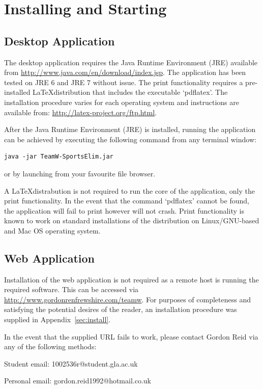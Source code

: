 \section{Installing and Starting}

\subsection{Desktop Application}

The desktop application requires the Java Runtime Environment (JRE) available
from \url{http://www.java.com/en/download/index.jsp}. The application has been
tested on JRE 6 and JRE 7 without issue. The print functionality
requires a pre-installed \LaTeX distribution that includes the
executable `pdflatex'. The installation procedure varies for each
operating system and instructions are available from:
\url{http://latex-project.org/ftp.html}.

After the Java Runtime Environment (JRE) is installed, running the application
can be achieved by executing the following command from any terminal
window:
\begin{verbatim}
java -jar TeamW-SportsElim.jar
\end{verbatim}
or by launching from your favourite file browser.

A \LaTeX distrabution is not required to run the core of the
application, only the print functionality. In the event that the
command `pdflatex' cannot be found, the application will fail to print
however will not crash. Print functionality is known to work on
standard installations of the distribution on Linux/GNU-based and Mac
OS operating system. 

\subsection{Web Application}
\label{sec:WEBAPP}
Installation of the web application is not required as a remote host is running
the required software. This can be accessed via
\url{http://www.gordonrenfrewshire.com/teamw}. For purposes of completeness and
satisfying the potential desires of the reader, an installation procedure was
supplied in Appendix~\ref{sec:install}.

In the event that the supplied URL fails to work, please contact Gordon Reid via
any of the following methods:

Student email: 1002536r@student.gla.ac.uk

Personal email: gordon.reid1992@hotmail.co.uk

